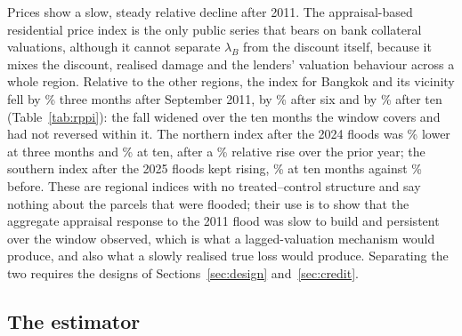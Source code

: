 Prices show a slow, steady relative decline after 2011. The appraisal-based residential price index is the only public series that bears on bank collateral valuations, although it cannot separate $\lambda_B$ from the discount itself, because it mixes the discount, realised damage and the lenders' valuation behaviour across a whole region. Relative to the other regions, the index for Bangkok and its vicinity fell by \rppiBkkThree\% three months after September 2011, by \rppiBkkSix\% after six and by \rppiBkkTen\% after ten (Table~\ref{tab:rppi}): the fall widened over the ten months the window covers and had not reversed within it. The northern index after the 2024 floods was \rppiNorthThree\% lower at three months and \rppiNorthTen\% at ten, after a \rppiNorthPre\% relative rise over the prior year; the southern index after the 2025 floods kept rising, \rppiSouthTen\% at ten months against \rppiSouthPre\% before. These are regional indices with no treated--control structure and say nothing about the parcels that were flooded; their use is to show that the aggregate appraisal response to the 2011 flood was slow to build and persistent over the window observed, which is what a lagged-valuation mechanism would produce, and also what a slowly realised true loss would produce. Separating the two requires the designs of Sections~\ref{sec:design} and~\ref{sec:credit}.

\subsection{The estimator}

